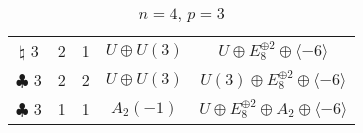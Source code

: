 \documentclass{amsart}
\theoremstyle{definition}
\begin{document}
\begin{table}[p]
\begin{tabular}{c|c|c|c|c}
 $\natural$ 3&2&1&$U\oplus U(3)$&$U\oplus E_8^{\oplus 2}\oplus \langle -6\rangle$\\
 
 $\clubsuit$ 3&2&2&$U\oplus U(3)$&$U(3)\oplus E_8^{\oplus 2}\oplus \langle -6\rangle$\\
 \hline
 
 $\clubsuit$ 3&1&1&$A_2(-1)$&$U\oplus E_8^{\oplus 2}\oplus A_2\oplus \langle -6\rangle$\\
 \end{tabular}
 \vspace*{2mm}
 \caption{$n = 4$, $p = 3$}\label{n=4,ord3}
 \end{table}


\clearpage


\end{document}

